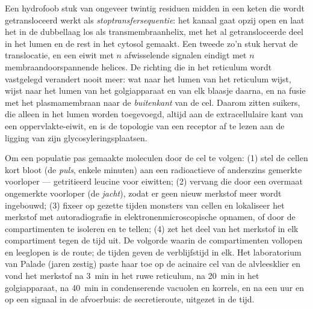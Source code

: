 \begin{proposition}\label{prop:b3:membrane-traffic:topology}
Een hydrofoob stuk van ongeveer twintig residuen midden in een keten
die wordt getransloceerd werkt als \emph{stoptransfersequentie}: het
kanaal gaat opzij open en laat het in de dubbellaag los als
transmembraanhelix, met het al getransloceerde deel in het lumen en de
rest in het cytosol gemaakt. Een tweede zo'n stuk hervat de
translocatie, en een eiwit met $n$ afwisselende signalen eindigt met
$n$ membraandoorspannende helices. De richting die in het reticulum
wordt vastgelegd verandert nooit meer: wat naar het lumen van het
reticulum wijst, wijst naar het lumen van het golgiapparaat en van elk
blaasje daarna, en na fusie met het plasmamembraan naar de
\emph{buitenkant} van de cel. Daarom zitten suikers, die alleen in het
lumen worden toegevoegd, altijd aan de extracellulaire kant van een
oppervlakte-eiwit, en is de topologie van een receptor af te lezen aan
de ligging van zijn glycosyleringsplaatsen.
\end{proposition}

\begin{method}\label{met:b3:membrane-traffic:pulse-chase}
Om een populatie pas gemaakte moleculen door de cel te volgen: (1)
stel de cellen kort bloot (de \emph{puls}, enkele minuten) aan een
radioactieve of anderszins gemerkte voorloper --- getritieerd leucine
voor eiwitten; (2) vervang die door een overmaat ongemerkte voorloper
(de \emph{jacht}), zodat er geen nieuw merkstof meer wordt ingebouwd;
(3) fixeer op gezette tijden monsters van cellen en lokaliseer het
merkstof met autoradiografie in elektronenmicroscopische opnamen, of
door de compartimenten te isoleren en te tellen; (4) zet het deel van
het merkstof in elk compartiment tegen de tijd uit. De volgorde waarin
de compartimenten vollopen en leeglopen is de route; de tijden geven de
verblijfstijd in elk. Het laboratorium van Palade (jaren zestig) paste
haar toe op de acinaire cel van de alvleesklier en vond het merkstof
na \qty{3}{min} in het ruwe reticulum, na \qty{20}{min} in het
golgiapparaat, na \qty{40}{min} in condenserende vacuolen en korrels,
en na een uur en op een signaal in de afvoerbuis: de secretieroute,
uitgezet in de tijd.
\end{method}

